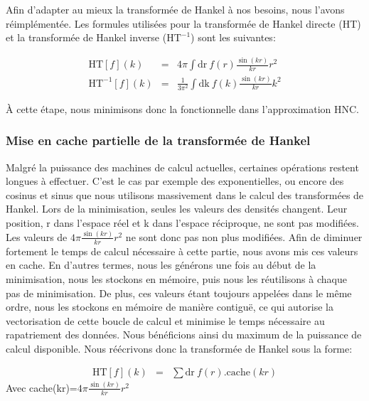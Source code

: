 Afin d'adapter au mieux la transformée de Hankel à nos besoins, nous l'avons réimplémentée. Les formules utilisées pour la transformée de Hankel directe (HT) et la transformée de Hankel inverse ($\mathrm{HT}^{-1}$) sont les suivantes:


\begin{eqnarray}
\mathrm{HT}[f](k) &=& 4\pi\int \mathrm{dr}\ f(r)\frac{\sin(kr)}{kr}r^2\\
\mathrm{HT}^{-1}[f](k) &=& \frac{1}{3\pi^2}\int \mathrm{dk}\ f(k)\frac{\sin(kr)}{kr}k^2
\end{eqnarray}

À cette étape, nous minimisons donc la fonctionnelle dans l'approximation HNC.  


\subsubsection{Mise en cache partielle de la transformée de Hankel}
Malgré la puissance des machines de calcul actuelles, certaines opérations restent longues à effectuer. C'est le cas par exemple des exponentielles, ou encore des cosinus et sinus que nous utilisons massivement dans le calcul des transformées de Hankel.
Lors de la minimisation, seules les valeurs des densités changent. Leur position, r dans l'espace réel et k dans l'espace réciproque, ne sont pas modifiées. Les valeurs de $4\pi\frac{\sin(kr)}{kr}r^2$ ne sont donc pas non plus modifiées. Afin de diminuer fortement le temps de calcul nécessaire à cette partie, nous avons mis ces valeurs en cache. En d'autres termes, nous les générons une fois au début de la minimisation, nous les stockons en mémoire, puis nous les réutilisons à chaque pas de minimisation. De plus, ces valeurs étant toujours appelées dans le même ordre, nous les stockons en mémoire de manière contiguë, ce qui autorise la vectorisation de cette boucle de calcul et minimise le temps nécessaire au rapatriement des données. Nous bénéficions ainsi du maximum de la puissance de calcul disponible. Nous réécrivons donc la transformée de Hankel sous la forme:

\begin{eqnarray}
\mathrm{HT}[f](k) &=& \sum \mathrm{dr}\ f(r) . \mathrm{cache}(kr)
\end{eqnarray}
Avec cache(kr)=$4\pi\frac{\sin(kr)}{kr}r^2$


